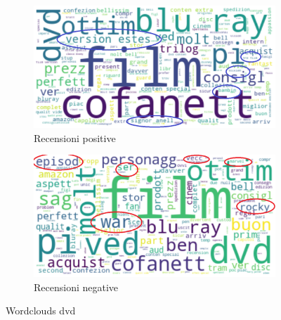 			\begin{figure} [h]
				\centering
				\begin{subfigure}{0.48\textwidth}
					\includegraphics[width=\textwidth]{Figure/top_positive_dvd}
					\caption{Recensioni positive}
					\label{fig:top_positive_dvd}
				\end{subfigure}
				\begin{subfigure}{0.48\textwidth}
					\includegraphics[width=\textwidth]{Figure/top_negative_dvd}
					\caption{Recensioni negative}
					\label{fig:top_negative_dvd}
				\end{subfigure}
				\caption{Wordclouds dvd}\label{fig:wordclouds_dvd}
			\end{figure}
		
